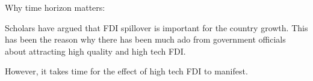 Why time horizon matters:

Scholars have argued that FDI spillover is important for the country growth. This has been the reason why there has been much ado from government officials about attracting high quality and high tech FDI.

However, it takes time for the effect of high tech FDI to manifest. 